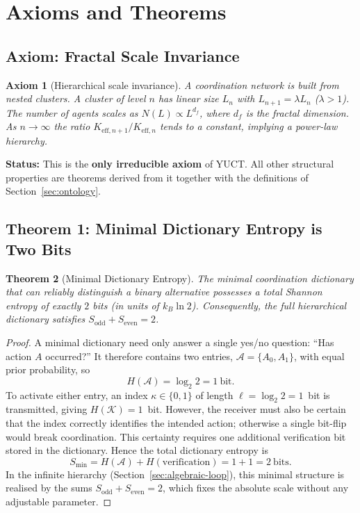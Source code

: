 \documentclass[12pt,a4paper]{article}
\newtheorem{theorem}{Theorem}[section]
\newtheorem{axiom}[theorem]{Axiom}
\begin{document}
	\section{Axioms and Theorems}
	\label{sec:axioms}
	
	\subsection{Axiom: Fractal Scale Invariance}
	
	\begin{axiom}[Hierarchical scale invariance] \label{ax:A1}
		A coordination network is built from nested clusters. A cluster of level \(n\) has linear size \(L_n\) with \(L_{n+1} = \lambda L_n\) (\(\lambda > 1\)). The number of agents scales as \(N(L) \propto L^{d_f}\), where \(d_f\) is the fractal dimension. As \(n \to \infty\) the ratio \(K_{\mathrm{eff},n+1}/K_{\mathrm{eff},n}\) tends to a constant, implying a power-law hierarchy.
	\end{axiom}
	
	\textbf{Status:} This is the \textbf{only irreducible axiom} of YUCT. All other structural properties are theorems derived from it together with the definitions of Section~\ref{sec:ontology}.
	
	\subsection{Theorem 1: Minimal Dictionary Entropy is Two Bits}
	
	\begin{theorem}[Minimal Dictionary Entropy]
		\label{thm:minimal-dict}
		The minimal coordination dictionary that can reliably distinguish a binary alternative possesses a total Shannon entropy of exactly \(2\) bits (in units of \(k_B\ln 2\)). Consequently, the full hierarchical dictionary satisfies \(S_{\mathrm{odd}} + S_{\mathrm{even}} = 2\).
	\end{theorem}
	
	\begin{proof}
		A minimal dictionary need only answer a single yes/no question: ``Has action \(A\) occurred?'' It therefore contains two entries, \(\mathcal{A} = \{A_0, A_1\}\), with equal prior probability, so
		\[
		H(\mathcal{A}) = \log_2 2 = 1\ \text{bit}.
		\]
		To activate either entry, an index \(\kappa \in \{0,1\}\) of length \(\ell = \log_2 2 = 1\)~bit is transmitted, giving \(H(\mathcal{K}) = 1\)~bit. However, the receiver must also be certain that the index correctly identifies the intended action; otherwise a single bit-flip would break coordination. This certainty requires one additional verification bit stored in the dictionary. Hence the total dictionary entropy is
		\[
		S_{\min} = H(\mathcal{A}) + H(\text{verification}) = 1 + 1 = 2\ \text{bits}.
		\]
		In the infinite hierarchy (Section~\ref{sec:algebraic-loop}), this minimal structure is realised by the sums \(S_{\mathrm{odd}} + S_{\mathrm{even}} = 2\), which fixes the absolute scale without any adjustable parameter.
	\end{proof}
	
\end{document}
